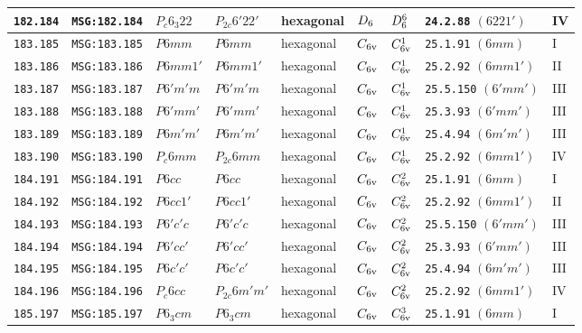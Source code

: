 \documentclass[fleqn,10pt]{jsarticle}
\begin{document}
\begin{center}
\begin{longtable}{lllllllll}
\texttt{182.184} & \texttt{MSG:182.184} & $P_{c}6_{3}22$ & $P_{2c}6'22'$ & hexagonal & $D_{\rm 6}$ & $D_{\rm 6}^{6}$ & \texttt{24.2.88} $(6221')$ & IV \\ \hline
\texttt{183.185} & \texttt{MSG:183.185} & $P6mm$ & $P6mm$ & hexagonal & $C_{\rm 6v}$ & $C_{\rm 6v}^{1}$ & \texttt{25.1.91} $(6mm)$ & I \\
\texttt{183.186} & \texttt{MSG:183.186} & $P6mm1'$ & $P6mm1'$ & hexagonal & $C_{\rm 6v}$ & $C_{\rm 6v}^{1}$ & \texttt{25.2.92} $(6mm1')$ & II \\
\texttt{183.187} & \texttt{MSG:183.187} & $P6'm'm$ & $P6'm'm$ & hexagonal & $C_{\rm 6v}$ & $C_{\rm 6v}^{1}$ & \texttt{25.5.150} $(6'mm')$ & III \\
\texttt{183.188} & \texttt{MSG:183.188} & $P6'mm'$ & $P6'mm'$ & hexagonal & $C_{\rm 6v}$ & $C_{\rm 6v}^{1}$ & \texttt{25.3.93} $(6'mm')$ & III \\
\texttt{183.189} & \texttt{MSG:183.189} & $P6m'm'$ & $P6m'm'$ & hexagonal & $C_{\rm 6v}$ & $C_{\rm 6v}^{1}$ & \texttt{25.4.94} $(6m'm')$ & III \\
\texttt{183.190} & \texttt{MSG:183.190} & $P_{c}6mm$ & $P_{2c}6mm$ & hexagonal & $C_{\rm 6v}$ & $C_{\rm 6v}^{1}$ & \texttt{25.2.92} $(6mm1')$ & IV \\ \hline
\texttt{184.191} & \texttt{MSG:184.191} & $P6cc$ & $P6cc$ & hexagonal & $C_{\rm 6v}$ & $C_{\rm 6v}^{2}$ & \texttt{25.1.91} $(6mm)$ & I \\
\texttt{184.192} & \texttt{MSG:184.192} & $P6cc1'$ & $P6cc1'$ & hexagonal & $C_{\rm 6v}$ & $C_{\rm 6v}^{2}$ & \texttt{25.2.92} $(6mm1')$ & II \\
\texttt{184.193} & \texttt{MSG:184.193} & $P6'c'c$ & $P6'c'c$ & hexagonal & $C_{\rm 6v}$ & $C_{\rm 6v}^{2}$ & \texttt{25.5.150} $(6'mm')$ & III \\
\texttt{184.194} & \texttt{MSG:184.194} & $P6'cc'$ & $P6'cc'$ & hexagonal & $C_{\rm 6v}$ & $C_{\rm 6v}^{2}$ & \texttt{25.3.93} $(6'mm')$ & III \\
\texttt{184.195} & \texttt{MSG:184.195} & $P6c'c'$ & $P6c'c'$ & hexagonal & $C_{\rm 6v}$ & $C_{\rm 6v}^{2}$ & \texttt{25.4.94} $(6m'm')$ & III \\
\texttt{184.196} & \texttt{MSG:184.196} & $P_{c}6cc$ & $P_{2c}6m'm'$ & hexagonal & $C_{\rm 6v}$ & $C_{\rm 6v}^{2}$ & \texttt{25.2.92} $(6mm1')$ & IV \\ \hline
\texttt{185.197} & \texttt{MSG:185.197} & $P6_{3}cm$ & $P6_{3}cm$ & hexagonal & $C_{\rm 6v}$ & $C_{\rm 6v}^{3}$ & \texttt{25.1.91} $(6mm)$ & I \\

\end{longtable}
\end{center}
\end{document}
